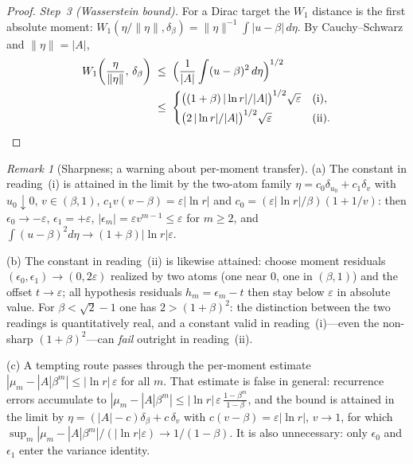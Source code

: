 \documentclass[12pt]{amsart}
\theoremstyle{definition}
\theoremstyle{remark}
\newtheorem*{remark}{Remark}
\begin{document}
\begin{proof}
\textit{Step~3 (Wasserstein bound).}  For a Dirac target the
$W_1$ distance is the first absolute moment:
$W_1(\eta/\|\eta\|, \delta_\beta) = \|\eta\|^{-1}\int|u-\beta|
\,d\eta$.  By Cauchy--Schwarz and $\|\eta\| = |A|$,
\[
\begin{aligned}
  W_1\!\left(\frac{\eta}{\|\eta\|},\,\delta_\beta\right)
  &\;\le\; \Bigl(\frac{1}{|A|}\int (u-\beta)^2\,d\eta\Bigr)^{1/2}\\
  &\;\le\;
  \begin{cases}
    \bigl((1+\beta)\,|\ln r|/|A|\bigr)^{1/2}\sqrt{\varepsilon}
      & \text{(i)},\\[2pt]
    \bigl(2\,|\ln r|/|A|\bigr)^{1/2}\sqrt{\varepsilon}
      & \text{(ii)}.
  \end{cases}
\end{aligned} \qedhere
\]
\end{proof}

\begin{remark}[Sharpness; a warning about per-moment transfer]
\textup{(a)} The constant in reading~(i) is attained in the limit by
the two-atom family $\eta = c_0\delta_{u_0} + c_1\delta_v$ with
$u_0 \downarrow 0$, $v \in (\beta,1)$, $c_1 v(v-\beta) =
\varepsilon|\ln r|$ and $c_0 = (\varepsilon|\ln r|/\beta)(1 + 1/v)$:
then $\epsilon_0 \to -\varepsilon$, $\epsilon_1 = +\varepsilon$,
$|\epsilon_m| = \varepsilon v^{m-1} \le \varepsilon$ for $m \ge 2$,
and $\int(u-\beta)^2 d\eta \to (1+\beta)|\ln r|\varepsilon$.

\textup{(b)} The constant in reading~(ii) is likewise attained:
choose moment residuals $(\epsilon_0, \epsilon_1) \to (0,
2\varepsilon)$ realized by two atoms (one near $0$, one in
$(\beta,1)$) and the offset $t \to \varepsilon$; all hypothesis
residuals $h_m = \epsilon_m - t$ then stay below $\varepsilon$ in
absolute value.  For $\beta < \sqrt2 - 1$ one has $2 >
(1+\beta)^2$: the distinction between the two readings is
quantitatively real, and a constant valid in reading~(i)---even the
non-sharp $(1+\beta)^2$---can \emph{fail} outright in reading~(ii).

\textup{(c)} A tempting route passes through the per-moment estimate
$|\mu_m - |A|\beta^m| \le |\ln r|\,\varepsilon$ for all $m$.  That
estimate is false in general: recurrence errors accumulate to
$|\mu_m - |A|\beta^m| \le |\ln r|\,\varepsilon\,
\tfrac{1-\beta^m}{1-\beta}$, and the bound is attained in the limit
by $\eta = (|A|-c)\delta_\beta + c\,\delta_v$ with $c(v-\beta) =
\varepsilon|\ln r|$, $v \to 1$, for which
$\sup_m |\mu_m - |A|\beta^m| / (|\ln r|\varepsilon) \to
1/(1-\beta)$.  It is also unnecessary: only $\epsilon_0$ and
$\epsilon_1$ enter the variance identity.
\end{remark}
\end{document}
